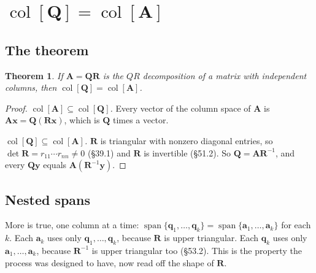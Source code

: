 \documentclass[11pt]{article}
\theoremstyle{plain}
\newtheorem{thm}{Theorem}[section]
\theoremstyle{definition}
\theoremstyle{remark}
\newcommand{\vc}[1]{\mathbf{#1}}
\newcommand{\mt}[1]{\mathbf{#1}}
\newcommand{\colsp}[1]{\operatorname{col}[#1]}
\DeclareMathOperator{\spanop}{span}
\begin{document}
\section{\texorpdfstring{$\colsp{\mt{Q}}=\colsp{\mt{A}}$}{col[Q] = col[A]}}

\subsection{The theorem}
\begin{thm}
\label{thm:samecol}
If $\mt{A}=\mt{Q}\mt{R}$ is the $QR$ decomposition of a matrix with independent
columns, then $\colsp{\mt{Q}}=\colsp{\mt{A}}$.
\end{thm}

\begin{proof}
\emph{$\colsp{\mt{A}}\subseteq\colsp{\mt{Q}}$.} Every vector of the column space of
$\mt{A}$ is $\mt{A}\vc{x}=\mt{Q}(\mt{R}\vc{x})$, which is $\mt{Q}$ times a vector.

\emph{$\colsp{\mt{Q}}\subseteq\colsp{\mt{A}}$.} $\mt{R}$ is triangular with nonzero
diagonal entries, so $\det\mt{R}=r_{11}\cdots r_{nn}\neq0$ (\S39.1) and $\mt{R}$ is
invertible (\S51.2). So $\mt{Q}=\mt{A}\mt{R}^{-1}$, and every $\mt{Q}\vc{y}$ equals
$\mt{A}(\mt{R}^{-1}\vc{y})$.
\end{proof}

\subsection{Nested spans}
More is true, one column at a time:
$\spanop\{\vc{q}_1,\dots,\vc{q}_k\}=\spanop\{\vc{a}_1,\dots,\vc{a}_k\}$ for each
$k$. Each $\vc{a}_k$ uses only $\vc{q}_1,\dots,\vc{q}_k$, because $\mt{R}$ is upper
triangular. Each $\vc{q}_k$ uses only $\vc{a}_1,\dots,\vc{a}_k$, because
$\mt{R}^{-1}$ is upper triangular too (\S53.2). This is the property the
process was designed to have, now read off the shape of $\mt{R}$.

\end{document}
